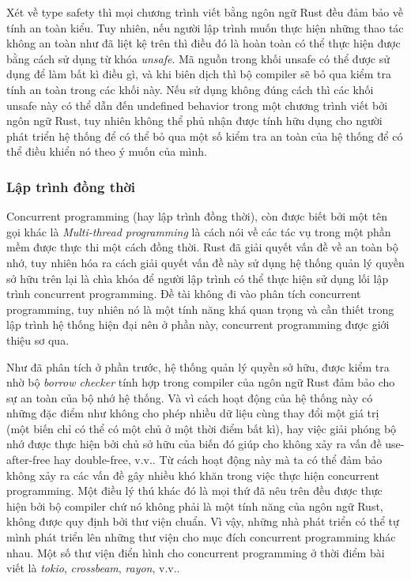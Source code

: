 Xét về type safety thì mọi chương trình viết bằng ngôn ngữ Rust đều đảm bảo về tính an toàn kiểu. Tuy nhiên, nếu người lập trình muốn thực hiện những thao tác không an toàn như đã liệt kệ trên thì điều đó là hoàn toàn có thể thực hiện được bằng cách sử dụng từ khóa \emph{unsafe}.
Mã nguồn trong khối unsafe có thể được sử dụng để làm bất kì điều gì, và khi biên dịch thì bộ compiler sẽ bỏ qua kiểm tra tính an toàn trong các khối này.
Nếu sử dụng không đúng cách thì các khối unsafe này có thể dẫn đến undefined behavior trong một chương trình viết bởi ngôn ngữ Rust, tuy nhiên không thể phủ nhận được tính hữu dụng cho người phát triển hệ thống để có thể bỏ qua một số kiểm tra an toàn của hệ thống để có thể điều khiển nó theo ý muốn của mình.

\subsubsection{Lập trình đồng thời}
Concurrent programming (hay lập trình đồng thời), còn được biết bởi một tên gọi khác là \emph{Multi-thread programming} là cách nói về các tác vụ trong một phần mềm được thực thi một cách đồng thời.
Rust đã giải quyết vấn đề về an toàn bộ nhớ, tuy nhiên hóa ra cách giải quyết vấn đề này sử dụng hệ thống quản lý quyền sở hữu trên lại là chìa khóa để người lập trình có thể thực hiện sử dụng lối lập trình concurrent programming.
Đề tài không đi vào phân tích concurrent programming, tuy nhiên nó là một tính năng khá quan trọng và cần thiết trong lập trình hệ thống hiện đại nên ở phần này, concurrent programming được giới thiệu sơ qua.

Như đã phân tích ở phần trước, hệ thống quản lý quyền sở hữu, được kiểm tra nhờ bộ \emph{borrow checker} tính hợp trong compiler của ngôn ngữ Rust đảm bảo cho sự an toàn của bộ nhớ hệ thống.
Và vì cách hoạt động của hệ thống này có những đặc điểm như không cho phép nhiều dữ liệu cùng thay đổi một giá trị (một biến chỉ có thể có một chủ ở một thời điểm bất kì), hay việc giải phóng bộ nhớ được thực hiện bởi chủ sở hữu của biến đó giúp cho không xảy ra vấn đề use-after-free hay double-free, v.v..
Từ cách hoạt động này mà ta có thể đảm bảo không xảy ra các vấn đề gây nhiều khó khăn trong việc thực hiện concurrent programming.
Một điều lý thú khác đó là mọi thứ đã nêu trên đều được thực hiện bởi bộ compiler chứ nó không phải là một tính năng của ngôn ngữ Rust, không được quy định bởi thư viện chuẩn.
Vì vậy, những nhà phát triển có thể tự mình phát triển lên những thư viện cho mục đích concurrent programming khác nhau.
Một số thư viện điển hình cho concurrent programming ở thời điểm bài viết là \emph{tokio}, \emph{crossbeam}, \emph{rayon}, v.v..

